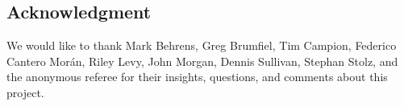 
\subsection*{Acknowledgment}

We would like to thank Mark Behrens, Greg Brumfiel, Tim Campion, Federico Cantero Mor\'an, Riley Levy, John Morgan, Dennis Sullivan, Stephan Stolz, and the anonymous referee for their insights, questions, and comments about this project.